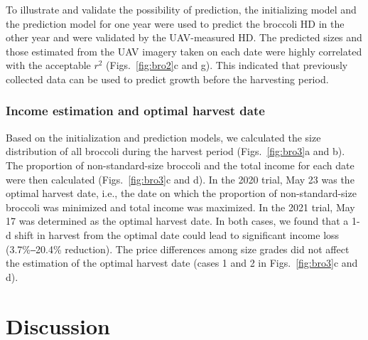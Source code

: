 

To illustrate and validate the possibility of prediction, the initializing model and the prediction model for one year were used to predict the broccoli HD in the other year and were validated by the UAV-measured HD. The predicted sizes and those estimated from the UAV imagery taken on each date were highly correlated with the acceptable $r^2$ (Figs.~\ref{fig:bro2}c and g). This indicated that previously collected data can be used to predict growth before the harvesting period.

\subsubsection*{Income estimation and optimal harvest date}

Based on the initialization and prediction models, we calculated the size distribution of all broccoli during the harvest period (Figs.~\ref{fig:bro3}a and b). The proportion of non-standard-size broccoli and the total income for each date were then calculated (Figs.~\ref{fig:bro3}c and d). In the 2020 trial, May 23 was the optimal harvest date, i.e., the date on which the proportion of non-standard-size broccoli was minimized and total income was maximized. In the 2021 trial, May 17 was determined as the optimal harvest date. In both cases, we found that a 1-d shift in harvest from the optimal date could lead to significant income loss (3.7\%‒20.4\% reduction). The price differences among size grades did not affect the estimation of the optimal harvest date (cases 1 and 2 in Figs.~\ref{fig:bro3}c and d).




\section{Discussion}

